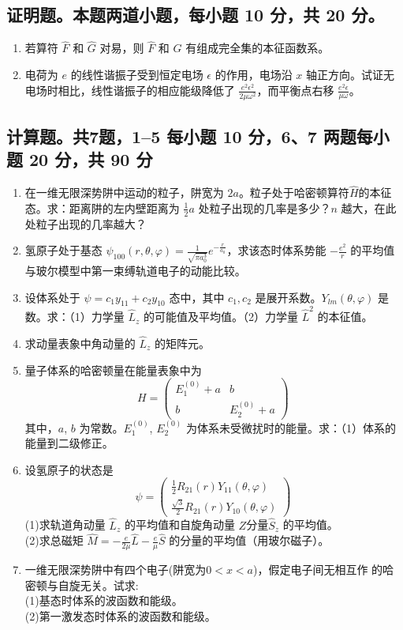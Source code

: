 \subsection{证明题。本题两道小题，每小题 10 分，共 20 分。}
\begin{enumerate}
    \item 若算符 $\hat{F}$ 和 $\hat{G}$ 对易，则 $\hat{F}$ 和 $\hat{G}$ 有组成完全集的本征函数系。
    \item 电荷为 $e$ 的线性谐振子受到恒定电场 $\epsilon$ 的作用，电场沿 $x$ 轴正方向。试证无电场时相比，线性谐振子的相应能级降低了 $\frac{e^2 \epsilon^2}{2\mu \omega^2}$，而平衡点右移 $\frac{e^2 \epsilon}{\mu \omega}$。
\end{enumerate}
\subsection{计算题。共7题，1--5 每小题 10 分，6、7 两题每小题 20 分，共 90 分}
\begin{enumerate}
    \item 在一维无限深势阱中运动的粒子，阱宽为 $2a$。粒子处于哈密顿算符$\hat H$的本征态。求：距离阱的左内壁距离为 $\frac{1}{2}a$ 处粒子出现的几率是多少？$n$ 越大，在此处粒子出现的几率越大？
    \item 氢原子处于基态 $\psi_{100} (r, \theta, \varphi) = \frac{1}{\sqrt{\pi a_0^3}} e^{- \frac{r}{a_0}}$，求该态时体系势能 $-\frac{e^2}{r}$ 的平均值与玻尔模型中第一束缚轨道电子的动能比较。
    \item 设体系处于 $\psi = c_1 y_{11} + c_2 y_{10}$ 态中，其中 $c_1, c_2$ 是展开系数。$Y_{lm}(\theta, \varphi)$ 是数。求：（1）力学量 $\hat L_z$ 的可能值及平均值。（2）力学量 $\hat L^2$ 的本征值。
    \item 求动量表象中角动量的 $\hat{L}_z$ 的矩阵元。
    \item 量子体系的哈密顿量在能量表象中为
    \[
    H = 
    \begin{pmatrix}
    E_1^{(0)} + a & b \\
    b & E_2^{(0)} + a
    \end{pmatrix}~
    \]
其中，$a$, $b$ 为常数。$E_1^{(0)}$, $E_2^{(0)}$ 为体系未受微扰时的能量。求：（1）体系的能量到二级修正。
    \item 设氢原子的状态是
\[
\psi = \begin{pmatrix}
\frac{1}{2} R_{21}(r)Y_{11}(\theta, \varphi) \\
\frac{\sqrt{3}}{2} R_{21}(r)Y_{10}(\theta, \varphi)
\end{pmatrix}~
\]
(1)求轨道角动量 $\hat{L}_z$ 的平均值和自旋角动量 $Z$分量$\hat{S}_z$ 的平均值。\\
(2)求总磁矩 $\hat{M} = -\frac{e}{2\mu}\hat{L} - \frac{e}{\mu} \hat{S}$ 的分量的平均值（用玻尔磁子）。
    \item 一维无限深势阱中有四个电子(阱宽为$0<x<a$)，假定电子间无相互作
的哈密顿与自旋无关。试求:\\
(1)基态时体系的波函数和能级。\\
(2)第一激发态时体系的波函数和能级。
\end{enumerate}